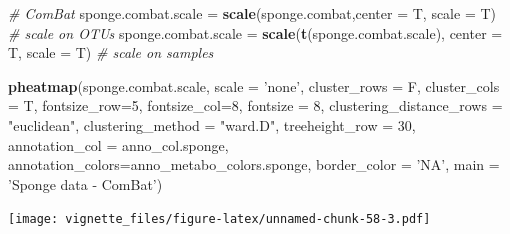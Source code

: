 \documentclass[]{book}
\newenvironment{Shaded}{\begin{snugshade}}{\end{snugshade}}
\newcommand{\KeywordTok}[1]{\textcolor[rgb]{0.13,0.29,0.53}{\textbf{#1}}}
\newcommand{\DataTypeTok}[1]{\textcolor[rgb]{0.13,0.29,0.53}{#1}}
\newcommand{\DecValTok}[1]{\textcolor[rgb]{0.00,0.00,0.81}{#1}}
\newcommand{\StringTok}[1]{\textcolor[rgb]{0.31,0.60,0.02}{#1}}
\newcommand{\CommentTok}[1]{\textcolor[rgb]{0.56,0.35,0.01}{\textit{#1}}}
\newcommand{\NormalTok}[1]{#1}
\begin{document}
\begin{Shaded}
\begin{Highlighting}[]
\CommentTok{# ComBat }
\NormalTok{sponge.combat.scale =}\StringTok{ }\KeywordTok{scale}\NormalTok{(sponge.combat,}\DataTypeTok{center =}\NormalTok{ T, }\DataTypeTok{scale =}\NormalTok{ T) }\CommentTok{# scale on OTUs}
\NormalTok{sponge.combat.scale =}\StringTok{ }\KeywordTok{scale}\NormalTok{(}\KeywordTok{t}\NormalTok{(sponge.combat.scale), }\DataTypeTok{center =}\NormalTok{ T, }\DataTypeTok{scale =}\NormalTok{ T) }\CommentTok{# scale on samples}

\KeywordTok{pheatmap}\NormalTok{(sponge.combat.scale, }
         \DataTypeTok{scale =} \StringTok{'none'}\NormalTok{, }
         \DataTypeTok{cluster_rows =}\NormalTok{ F, }
         \DataTypeTok{cluster_cols =}\NormalTok{ T, }
         \DataTypeTok{fontsize_row=}\DecValTok{5}\NormalTok{, }\DataTypeTok{fontsize_col=}\DecValTok{8}\NormalTok{,}
         \DataTypeTok{fontsize =} \DecValTok{8}\NormalTok{,}
         \DataTypeTok{clustering_distance_rows =} \StringTok{"euclidean"}\NormalTok{,}
         \DataTypeTok{clustering_method =} \StringTok{"ward.D"}\NormalTok{,}
         \DataTypeTok{treeheight_row =} \DecValTok{30}\NormalTok{,}
         \DataTypeTok{annotation_col =}\NormalTok{ anno_col.sponge,}
         \DataTypeTok{annotation_colors=}\NormalTok{anno_metabo_colors.sponge,}
         \DataTypeTok{border_color =} \StringTok{'NA'}\NormalTok{,}
         \DataTypeTok{main =} \StringTok{'Sponge data - ComBat'}\NormalTok{)}
\end{Highlighting}
\end{Shaded}

\texttt{[image: vignette\_files/figure-latex/unnamed-chunk-58-3.pdf]}
\end{document}

